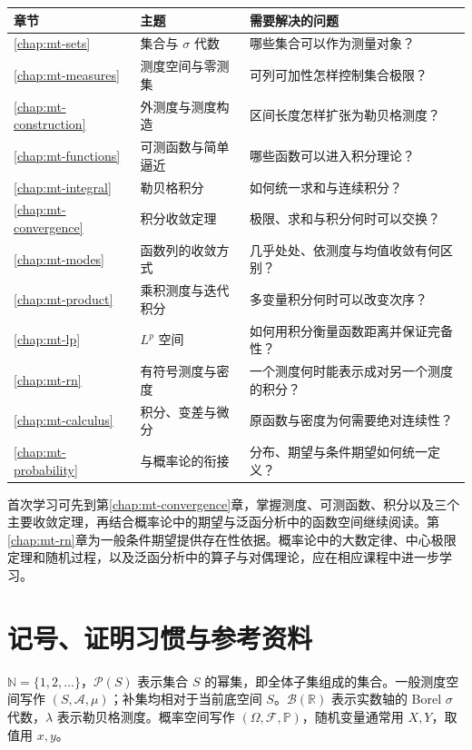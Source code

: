 \begin{longtable}{L{0.10\textwidth}L{0.30\textwidth}L{0.48\textwidth}}
\toprule
章节 & 主题 & 需要解决的问题\\
\midrule
\endhead
\ref{chap:mt-sets} & 集合与 $\sigma$ 代数 & 哪些集合可以作为测量对象？\\
\ref{chap:mt-measures} & 测度空间与零测集 & 可列可加性怎样控制集合极限？\\
\ref{chap:mt-construction} & 外测度与测度构造 & 区间长度怎样扩张为勒贝格测度？\\
\ref{chap:mt-functions} & 可测函数与简单逼近 & 哪些函数可以进入积分理论？\\
\ref{chap:mt-integral} & 勒贝格积分 & 如何统一求和与连续积分？\\
\ref{chap:mt-convergence} & 积分收敛定理 & 极限、求和与积分何时可以交换？\\
\ref{chap:mt-modes} & 函数列的收敛方式 & 几乎处处、依测度与均值收敛有何区别？\\
\ref{chap:mt-product} & 乘积测度与迭代积分 & 多变量积分何时可以改变次序？\\
\ref{chap:mt-lp} & $L^p$ 空间 & 如何用积分衡量函数距离并保证完备性？\\
\ref{chap:mt-rn} & 有符号测度与密度 & 一个测度何时能表示成对另一个测度的积分？\\
\ref{chap:mt-calculus} & 积分、变差与微分 & 原函数与密度为何需要绝对连续性？\\
\ref{chap:mt-probability} & 与概率论的衔接 & 分布、期望与条件期望如何统一定义？\\
\bottomrule
\end{longtable}

首次学习可先到第\ref{chap:mt-convergence}章，掌握测度、可测函数、积分以及三个主要收敛定理，再结合概率论中的期望与泛函分析中的函数空间继续阅读。第\ref{chap:mt-rn}章为一般条件期望提供存在性依据。概率论中的大数定律、中心极限定理和随机过程，以及泛函分析中的算子与对偶理论，应在相应课程中进一步学习。

\section{记号、证明习惯与参考资料}
$\mathbb N=\{1,2,\ldots\}$，$\mathcal P(S)$ 表示集合 $S$ 的幂集，即全体子集组成的集合。一般测度空间写作 $(S,\mathcal A,\mu)$；补集均相对于当前底空间 $S$。$\mathcal B(\mathbb R)$ 表示实数轴的 Borel $\sigma$ 代数，$\lambda$ 表示勒贝格测度。概率空间写作 $(\Omega,\mathcal F,\mathbb P)$，随机变量通常用 $X,Y$，取值用 $x,y$。

